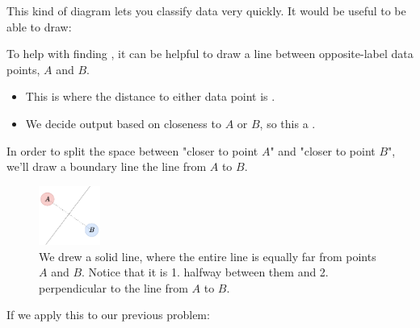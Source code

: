         This kind of diagram lets you classify data very quickly. It would be useful to be able to draw:\\
    
        \begin{concept}
            To help with finding , it can be helpful to draw a line  between opposite-label data points, $A$ and $B$.
            
            \begin{itemize}
                \item This is where the distance to either data point is . 
                \item We decide output based on closeness to $A$ or $B$, so this a .
            \end{itemize}

            \subsecdiv

            In order to split the space between "closer to point $A$" and "closer to point $B$", we'll draw a boundary line  the line from $A$ to $B$.
        \end{concept}

        \begin{figure}[H]
            \centering
            \includegraphics[width=20mm,scale=0.5]{images/nonparametric_images/simple_perpendicular.png}
    
            \caption*{We drew a solid line, where the entire line is equally far from points $A$ and $B$. Notice that it is 1. halfway between them and 2. perpendicular to the line from $A$ to $B$.}
        \end{figure}

        If we apply this to our previous problem:

